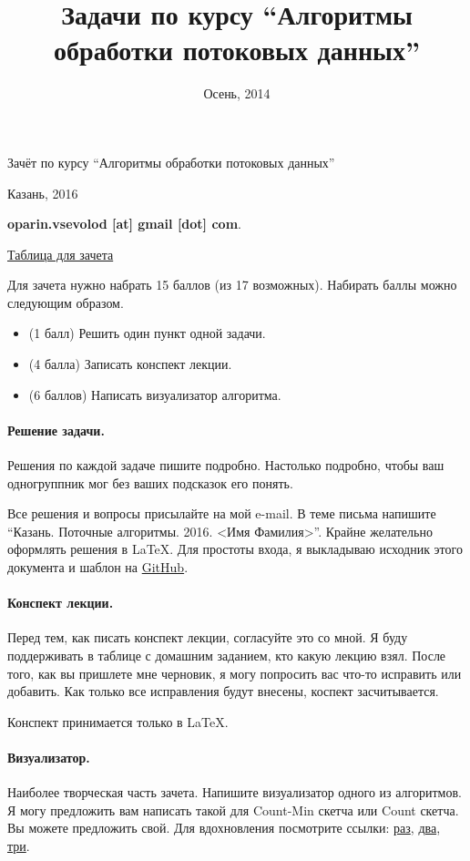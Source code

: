 \documentclass{article}
\title{Задачи по курсу ``Алгоритмы обработки потоковых данных''}
\date{Осень, 2014}
\begin{document}
\begin{center}
    {\Large Зачёт по курсу ``Алгоритмы обработки потоковых данных''}
    \vspace{0.3cm}

    {\large Казань, 2016}
\end{center}
\begin{flushright}
\textbf{oparin.vsevolod [at] gmail [dot] com}.\par
\href{https://docs.google.com/spreadsheets/d/1nsGop7vZAkOX1byVKugRFOMmGEu0Wg-MGzFm-ZxLfxo/edit?usp=sharing}{Таблица для зачета}\par
\end{flushright}

Для зачета нужно набрать 15 баллов (из 17 возможных). Набирать баллы можно следующим образом.
\begin{itemize}
    \item (1 балл) Решить один пункт одной задачи.
    \item (4 балла) Записать конспект лекции.
    \item (6 баллов) Написать визуализатор алгоритма.
\end{itemize}

\paragraph{Решение задачи.} Решения по каждой задаче пишите подробно. Настолько подробно, чтобы ваш одногруппник мог без ваших подсказок его понять. 

Все решения и вопросы присылайте на мой e-mail. В теме письма напишите ``Казань. Поточные алгоритмы. 2016. <Имя Фамилия>''. Крайне желательно оформлять решения в \LaTeX. Для простоты входа, я выкладываю исходник этого документа и шаблон на \href{https://github.com/vsevolod-oparin/streaming.2016-latex}{GitHub}.

\paragraph{Конспект лекции.} Перед тем, как писать конспект лекции, согласуйте это со мной. Я буду поддерживать в таблице с домашним заданием, кто какую лекцию взял. После того, как вы пришлете мне черновик, я могу попросить вас что-то исправить или добавить. Как только все исправления будут внесены, коспект засчитывается.

Конспект принимается только в \LaTeX.

\paragraph{Визуализатор.} Наиболее творческая часть зачета. Напишите визуализатор одного из алгоритмов. Я могу предложить вам написать такой для Count-Min скетча или Count скетча. Вы можете предложить свой. Для вдохновления посмотрите ссылки: \href{http://content.research.neustar.biz/blog/pcsa.html}{раз}, \href{http://content.research.neustar.biz/blog/hll.html}{два}, \href{http://content.research.neustar.biz/blog/runs.html}{три}. 
\end{document}
